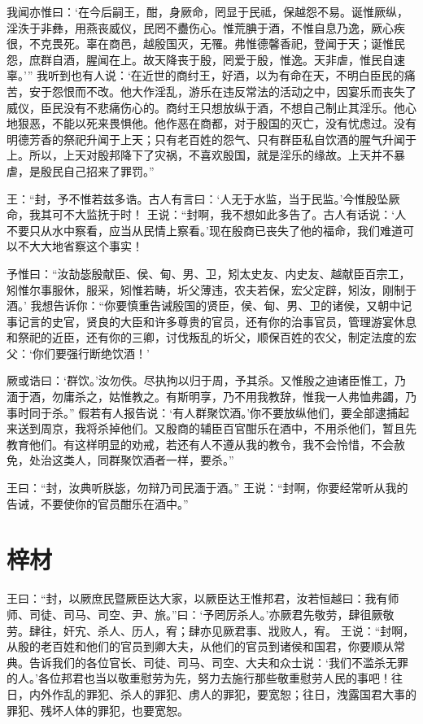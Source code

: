 \documentclass[a4paper,12pt,UTF8,twoside]{ctexbook}
\begin{document}
我闻亦惟曰：‘在今后嗣王，酣，身厥命，罔显于民祗，保越怨不易。诞惟厥纵，淫泆于非彝，用燕丧威仪，民罔不衋伤心。惟荒腆于酒，不惟自息乃逸，厥心疾很，不克畏死。辜在商邑，越殷国灭，无罹。弗惟德馨香祀，登闻于天；诞惟民怨，庶群自酒，腥闻在上。故天降丧于殷，罔爱于殷，惟逸。天非虐，惟民自速辜。’”
我听到也有人说：‘在近世的商纣王，好酒，以为有命在天，不明白臣民的痛苦，安于怨恨而不改。他大作淫乱，游乐在违反常法的活动之中，因宴乐而丧失了威仪，臣民没有不悲痛伤心的。商纣王只想放纵于酒，不想自己制止其淫乐。他心地狠恶，不能以死来畏惧他。他作恶在商都，对于殷国的灭亡，没有忧虑过。没有明德芳香的祭祀升闻于上天；只有老百姓的怨气、只有群臣私自饮酒的腥气升闻于上。所以，上天对殷邦降下了灾祸，不喜欢殷国，就是淫乐的缘故。上天并不暴虐，是殷民自己招来了罪罚。”

王：“封，予不惟若兹多诰。古人有言曰：‘人无于水监，当于民监。’今惟殷坠厥命，我其可不大监抚于时！
王说：“封啊，我不想如此多告了。古人有话说：‘人不要只从水中察看，应当从民情上察看。’现在殷商已丧失了他的福命，我们难道可以不大大地省察这个事实！

予惟曰：“汝劼毖殷献臣、侯、甸、男、卫，矧太史友、内史友、越献臣百宗工，矧惟尔事服休，服采，矧惟若畴，圻父薄违，农夫若保，宏父定辟，矧汝，刚制于酒。’
我想告诉你：“你要慎重告诫殷国的贤臣，侯、甸、男、卫的诸侯，又朝中记事记言的史官，贤良的大臣和许多尊贵的官员，还有你的治事官员，管理游宴休息和祭祀的近臣，还有你的三卿，讨伐叛乱的圻父，顺保百姓的农父，制定法度的宏父：‘你们要强行断绝饮酒！’

厥或诰曰：‘群饮。’汝勿佚。尽执拘以归于周，予其杀。又惟殷之迪诸臣惟工，乃湎于酒，勿庸杀之，姑惟教之。有斯明享，乃不用我教辞，惟我一人弗恤弗蠲，乃事时同于杀。”
假若有人报告说：‘有人群聚饮酒。’你不要放纵他们，要全部逮捕起来送到周京，我将杀掉他们。又殷商的辅臣百官酣乐在酒中，不用杀他们，暂且先教育他们。有这样明显的劝戒，若还有人不遵从我的教令，我不会怜惜，不会赦免，处治这类人，同群聚饮酒者一样，要杀。”

王曰：“封，汝典听朕毖，勿辩乃司民湎于酒。”
王说：“封啊，你要经常听从我的告诫，不要使你的官员酣乐在酒中。”

\chapter{梓材}

王曰：“封，以厥庶民暨厥臣达大家，以厥臣达王惟邦君，汝若恒越曰：我有师师、司徒、司马、司空、尹、旅。”曰：‘予罔厉杀人。’亦厥君先敬劳，肆徂厥敬劳。肆往，奸宄、杀人、历人，宥；肆亦见厥君事、戕败人，宥。
王说：“封啊，从殷的老百姓和他们的官员到卿大夫，从他们的官员到诸侯和国君，你要顺从常典。告诉我们的各位官长、司徒、司马、司空、大夫和众士说：‘我们不滥杀无罪的人。’各位邦君也当以敬重慰劳为先，努力去施行那些敬重慰劳人民的事吧！往日，内外作乱的罪犯、杀人的罪犯、虏人的罪犯，要宽恕；往日，洩露国君大事的罪犯、残坏人体的罪犯，也要宽恕。
\end{document}
